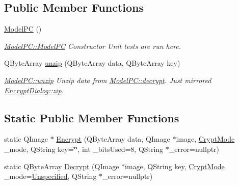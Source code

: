 \subsection*{Public Member Functions}
\begin{DoxyCompactItemize}
\item 
\hyperlink{class_model_p_c_ae12ebe65ec973c02a0de4850a7c1e31c}{Model\+PC} ()
\begin{DoxyCompactList}\small\item\em \hyperlink{class_model_p_c_ae12ebe65ec973c02a0de4850a7c1e31c}{Model\+P\+C\+::\+Model\+PC} Constructor Unit tests are run here. \end{DoxyCompactList}\item 
Q\+Byte\+Array \hyperlink{class_model_p_c_a6da88f166785a49f73b22c169f956fd0}{unzip} (Q\+Byte\+Array data, Q\+Byte\+Array key)
\begin{DoxyCompactList}\small\item\em \hyperlink{class_model_p_c_a6da88f166785a49f73b22c169f956fd0}{Model\+P\+C\+::unzip} Unzip data from \hyperlink{class_model_p_c_a69ea58f4455f8536c4be1d3f44424a60}{Model\+P\+C\+::decrypt}. Just mirrored \hyperlink{class_encrypt_dialog_a2bff820a3df4ddc36ecb07ed74b7138a}{Encrypt\+Dialog\+::zip}. \end{DoxyCompactList}\end{DoxyCompactItemize}
\subsection*{Static Public Member Functions}
\begin{DoxyCompactItemize}
\item 
static Q\+Image $\ast$ \hyperlink{class_model_p_c_aad427b77cf44b5dadc5523ea03272c85}{Encrypt} (Q\+Byte\+Array data, Q\+Image $\ast$image, \hyperlink{class_model_p_c_a296dd7afe3e1c49b3da25fd644fe4ceb}{Crypt\+Mode} \+\_\+mode, Q\+String key=\char`\"{}\char`\"{}, int \+\_\+bits\+Used=8, Q\+String $\ast$\+\_\+error=nullptr)
\item 
static Q\+Byte\+Array \hyperlink{class_model_p_c_afbca3c9c9b7d92f3a5cc81510ef06cc3}{Decrypt} (Q\+Image $\ast$image, Q\+String key, \hyperlink{class_model_p_c_a296dd7afe3e1c49b3da25fd644fe4ceb}{Crypt\+Mode} \+\_\+mode=\hyperlink{class_model_p_c_a296dd7afe3e1c49b3da25fd644fe4ceba56028870bb6c96c44e7ba33b82d39598}{Unspecified}, Q\+String $\ast$\+\_\+error=nullptr)
\end{DoxyCompactItemize}

